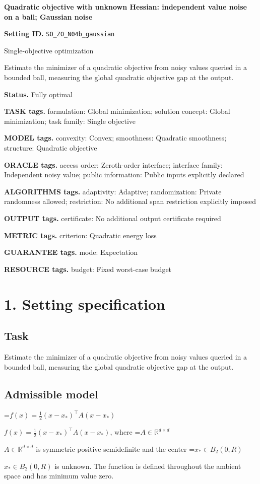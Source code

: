 \documentclass[10pt,a4paper]{article}
\newcommand{\AtlasMath}[1]{\par\begingroup\centering\setbox0=\hbox{$\displaystyle #1$}\ifdim\wd0>1.4\linewidth\typeout{ATLAS WIDE FORMULA: \the\wd0}\fi\ifdim\wd0>\linewidth\resizebox{\linewidth}{!}{\box0}\else\box0\fi\par\endgroup}
\newcommand{\AtlasInlineMath}[1]{\begingroup\setbox0=\hbox{$#1$}\ifdim\wd0>.4\linewidth\endgroup\AtlasMath{#1}\else\endgroup$#1$\fi}
\begin{document}
\raggedright

{\LARGE\bfseries\sffamily\color{AtlasNavy} Quadratic objective with unknown Hessian: independent value noise on a ball; Gaussian noise\par}\vspace{5pt}
\textbf{Setting ID.} \texttt{SO\_\allowbreak{}ZO\_\allowbreak{}N04b\_\allowbreak{}gaussian}

Single-objective optimization

Estimate the minimizer of a quadratic objective from noisy values queried in a bounded ball, measuring the global quadratic objective gap at the output.

\textbf{Status.} Fully optimal

\textbf{TASK tags.} formulation: Global minimization; solution concept: Global minimization; task family: Single objective

\textbf{MODEL tags.} convexity: Convex; smoothness: Quadratic smoothness; structure: Quadratic objective

\textbf{ORACLE tags.} access order: Zeroth-order interface; interface family: Independent noisy value; public information: Public inputs explicitly declared

\textbf{ALGORITHMS tags.} adaptivity: Adaptive; randomization: Private randomness allowed; restriction: No additional span restriction explicitly imposed

\textbf{OUTPUT tags.} certificate: No additional output certificate required

\textbf{METRIC tags.} criterion: Quadratic energy loss

\textbf{GUARANTEE tags.} mode: Expectation

\textbf{RESOURCE tags.} budget: Fixed worst-case budget

\section{1. Setting specification}
\subsection{Task}
Estimate the minimizer of a quadratic objective from noisy values queried in a bounded ball, measuring the global quadratic objective gap at the output.

\subsection{Admissible model}
\AtlasInlineMath{f(x)=\frac12(x-x_*)^\top A(x-x_*)}, where \AtlasInlineMath{A\in\mathbb{R}^{d\times d}} is symmetric positive semidefinite and the center \AtlasInlineMath{x_*\in B_2(0,R)} is unknown. The function is defined throughout the ambient space and has minimum value zero.
\end{document}

